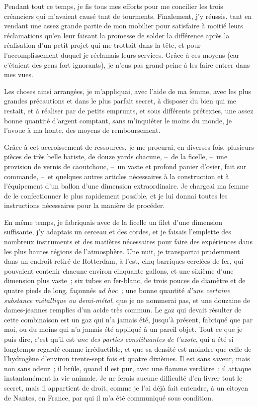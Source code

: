 \documentclass[french,twoside]{book} %
\begin{document}
Pendant tout ce temps, je fis tous mes efforts pour me concilier les trois créanciers qui m’avaient causé tant de tourments. Finalement, j’y réussis, tant en vendant une assez grande partie de mon mobilier pour satisfaire à moitié leurs réclamations qu’en leur faisant la promesse de solder la différence après la réalisation d’un petit projet qui me trottait dans la tête, et pour l’accomplissement duquel je réclamais leurs services. Grâce à ces moyens (car c’étaient des gens fort ignorants), je n’eus pas grand-peine à les faire entrer dans mes vues.\par
Les choses ainsi arrangées, je m’appliquai, avec l’aide de ma femme, avec les plus grandes précautions et dans le plus parfait secret, à disposer du bien qui me restait, et à réaliser par de petits emprunts, et sous différents prétextes, une assez bonne quantité d’argent comptant, sans m’inquiéter le moins du monde, je l’avoue à ma honte, des moyens de remboursement.\par
Grâce à cet accroissement de ressources, je me procurai, en diverses fois, plusieurs pièces de très belle batiste, de douze yards chacune, – de la ficelle, – une provision de vernis de caoutchouc, – un vaste et profond panier d’osier, fait sur commande, – et quelques autres articles nécessaires à la construction et à l’équipement d’un ballon d’une dimension extraordinaire. Je chargeai ma femme de le confectionner le plus rapidement possible, et je lui donnai toutes les instructions nécessaires pour la manière de procéder.\par
En même temps, je fabriquais avec de la ficelle un filet d’une dimension suffisante, j’y adaptais un cerceau et des cordes, et je faisais l’emplette des nombreux instruments et des matières nécessaires pour faire des expériences dans les plus hautes régions de l’atmosphère. Une nuit, je transportai prudemment dans un endroit retiré de Rotterdam, à l’est, cinq barriques cerclées de fer, qui pouvaient contenir chacune environ cinquante gallons, et une sixième d’une dimension plus vaste ; six tubes en fer-blanc, de trois pouces de diamètre et de quatre pieds de long, façonnés \emph{ad hoc ;} une bonne quantité \emph{d’une certaine substance métallique ou demi-métal}, que je ne nommerai pas, et une douzaine de dames-jeannes remplies d’un acide très commun. Le gaz qui devait résulter de cette combinaison est un gaz qui n’a jamais été, jusqu’à présent, fabriqué que par moi, ou du moins qui n’a jamais été appliqué à un pareil objet. Tout ce que je puis dire, c’est qu’il est \emph{une des parties constituantes de l’azote}, qui a été si longtemps regardé comme irréductible, et que sa densité est moindre que celle de l’hydrogène d’environ trente-sept fois et quatre dixièmes. Il est sans saveur, mais non sans odeur ; il brûle, quand il est pur, avec une flamme verdâtre ; il attaque instantanément la vie animale. Je ne ferais aucune difficulté d’en livrer tout le secret, mais il appartient de droit, comme je l’ai déjà fait entendre, à un citoyen de Nantes, en France, par qui il m’a été communiqué sous condition.\par
\end{document}

